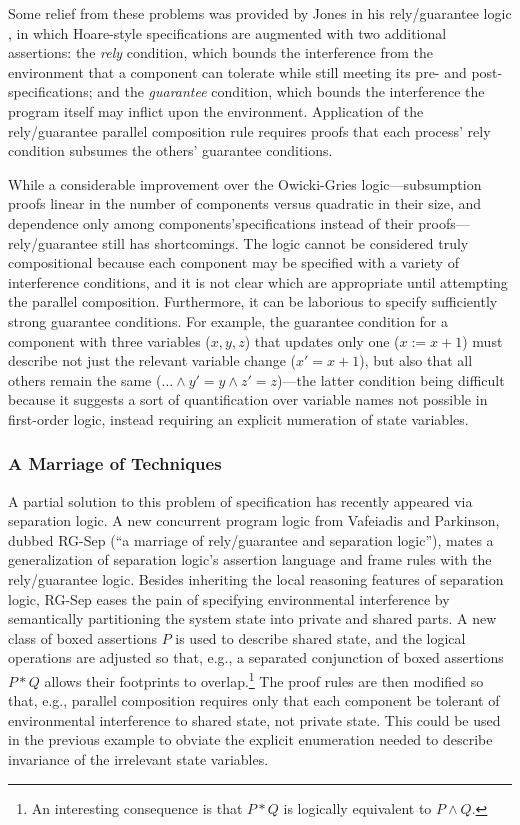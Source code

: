 \documentclass[11pt]{article}
\begin{document}
Some relief from these problems was provided by Jones in his rely/guarantee logic \cite{JonesRelyGuar}, in which Hoare-style specifications are augmented with two additional assertions: the \emph{rely} condition, which bounds the interference from the environment that a component can tolerate while still meeting its pre- and post-specifications; and the \emph{guarantee} condition, which bounds the interference the program itself may inflict upon the environment. Application of the rely/guarantee parallel composition rule requires proofs that each process' rely condition subsumes the others' guarantee conditions.

While a considerable improvement over the Owicki-Gries logic---subsumption proofs linear in the number of components versus quadratic in their size, and dependence only among components'specifications instead of their proofs---rely/guarantee still has shortcomings. The logic cannot be considered truly compositional because each component may be specified with a variety of interference conditions, and it is not clear which are appropriate until attempting the parallel composition. Furthermore, it can be laborious to specify sufficiently strong guarantee conditions. For example, the guarantee condition for a component with three variables ($x,y,z$) that updates only one ($x := x+1$) must describe not just the relevant variable change ($x' = x + 1$), but also that all others remain the same ($\ldots \wedge y' = y \wedge z' = z$)---the latter condition being difficult because it suggests a sort of quantification over variable names not possible in first-order logic, instead requiring an explicit numeration of state variables.

\subsubsection{A Marriage of Techniques}

A partial solution to this problem of specification has recently appeared via separation logic. A new concurrent program logic from Vafeiadis and Parkinson, dubbed RG-Sep \cite{DBLP:conf/concur/VafeiadisP07} (``a marriage of rely/guarantee and separation logic''), mates a generalization of separation logic's assertion language and frame rules with the rely/guarantee logic. Besides inheriting the local reasoning features of separation logic, RG-Sep eases the pain of specifying environmental interference by semantically partitioning the system state into private and shared parts. A new class of boxed assertions $\boxed{P}$ is used to describe shared state, and the logical operations are adjusted so that, e.g., a separated conjunction of boxed assertions $\boxed{P} * \boxed{Q}$ allows their footprints to overlap.\footnote{An interesting consequence is that $\boxed{P} * \boxed{Q}$ is logically equivalent to $\boxed{P \wedge Q}$.} The proof rules are then modified so that, e.g., parallel composition requires only that each component be tolerant of environmental interference to shared state, not private state. This could be used in the previous example to obviate the explicit enumeration needed to describe invariance of the irrelevant state variables.
\end{document}
